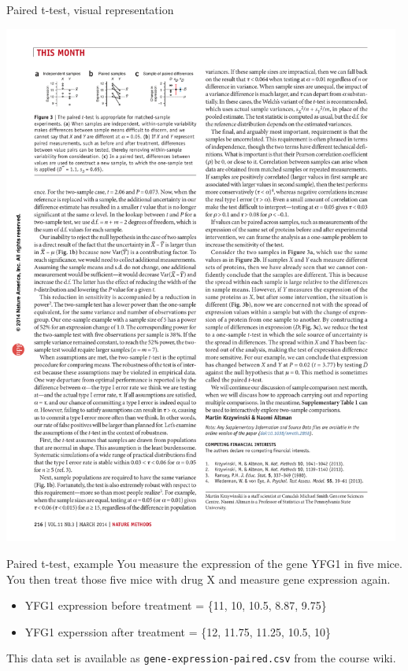 \documentclass[presentation]{beamer}
\begin{document}
\begin{frame}[label={sec:org26adda4}]{Paired t-test, visual representation}
\begin{center}
\includegraphics[width=0.98\textwidth]{fig-paired-ttest.pdf}
\end{center}
\end{frame}

\begin{frame}[fragile,label={sec:orga4b5f87}]{Paired t-test, example}
 You measure the expression of the gene YFG1 in five mice.  You then treat those five mice with drug X and measure gene expression again.

\begin{itemize}
\item YFG1 expression before treatment = \{11, 10, 10.5, 8.87, 9.75\}
\item YFG1 experssion after treatment = \{12, 11.75, 11.25, 10.5, 10\}
\end{itemize}

This data set is available as \texttt{gene-expression-paired.csv} from the course wiki.
\end{frame}
\end{document}

